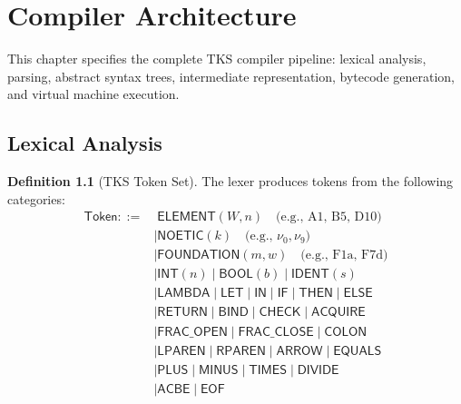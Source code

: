 \documentclass[11pt,twoside,openright]{book}
\theoremstyle{definition}
\newtheorem{definition}{Definition}[chapter]
\theoremstyle{plain}
\theoremstyle{remark}
\newcommand{\vnewtwo}{\textbf{v7.2 New}}
\begin{document}
\chapter{Compiler Architecture}
\label{ch:compiler}

\begin{tcolorbox}[colback=blue!5!white,colframe=blue!75!black,title=\vnewtwo]
This chapter specifies the complete TKS compiler pipeline: lexical analysis, parsing, abstract syntax trees, intermediate representation, bytecode generation, and virtual machine execution.
\end{tcolorbox}

\section{Lexical Analysis}

\begin{definition}[TKS Token Set]
\label{def:token-set}
The lexer produces tokens from the following categories:
\begin{align}
\mathsf{Token} ::=&\; \mathsf{ELEMENT}(W, n) \quad \text{(e.g., A1, B5, D10)} \\
    &\mid \mathsf{NOETIC}(k) \quad \text{(e.g., } \nu_0, \nu_9\text{)} \\
    &\mid \mathsf{FOUNDATION}(m, w) \quad \text{(e.g., F1a, F7d)} \\
    &\mid \mathsf{INT}(n) \mid \mathsf{BOOL}(b) \mid \mathsf{IDENT}(s) \\
    &\mid \mathsf{LAMBDA} \mid \mathsf{LET} \mid \mathsf{IN} \mid \mathsf{IF} \mid \mathsf{THEN} \mid \mathsf{ELSE} \\
    &\mid \mathsf{RETURN} \mid \mathsf{BIND} \mid \mathsf{CHECK} \mid \mathsf{ACQUIRE} \\
    &\mid \mathsf{FRAC\_OPEN} \mid \mathsf{FRAC\_CLOSE} \mid \mathsf{COLON} \\
    &\mid \mathsf{LPAREN} \mid \mathsf{RPAREN} \mid \mathsf{ARROW} \mid \mathsf{EQUALS} \\
    &\mid \mathsf{PLUS} \mid \mathsf{MINUS} \mid \mathsf{TIMES} \mid \mathsf{DIVIDE} \\
    &\mid \mathsf{ACBE} \mid \mathsf{EOF}
\end{align}
\end{definition}
\end{document}

